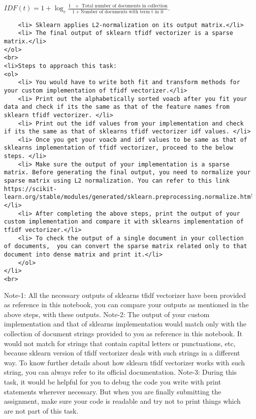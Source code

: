 \documentclass[11pt]{article}
\begin{document}
\(IDF(t) = 1+\log_{e}\frac{1\text{ }+\text{ Total  number of documents in collection}} {1+\text{Number of documents with term t in it}}.\)

\begin{verbatim}
    <li> Sklearn applies L2-normalization on its output matrix.</li>
    <li> The final output of sklearn tfidf vectorizer is a sparse matrix.</li>
</ol>
<br>
<li>Steps to approach this task:
<ol>
    <li> You would have to write both fit and transform methods for your custom implementation of tfidf vectorizer.</li>
    <li> Print out the alphabetically sorted voacb after you fit your data and check if its the same as that of the feature names from sklearn tfidf vectorizer. </li>
    <li> Print out the idf values from your implementation and check if its the same as that of sklearns tfidf vectorizer idf values. </li>
    <li> Once you get your voacb and idf values to be same as that of sklearns implementation of tfidf vectorizer, proceed to the below steps. </li>
    <li> Make sure the output of your implementation is a sparse matrix. Before generating the final output, you need to normalize your sparse matrix using L2 normalization. You can refer to this link https://scikit-learn.org/stable/modules/generated/sklearn.preprocessing.normalize.html </li>
    <li> After completing the above steps, print the output of your custom implementation and compare it with sklearns implementation of tfidf vectorizer.</li>
    <li> To check the output of a single document in your collection of documents,  you can convert the sparse matrix related only to that document into dense matrix and print it.</li>
    </ol>
</li>
<br>
\end{verbatim}

Note-1: All the necessary outputs of sklearns tfidf vectorizer have been
provided as reference in this notebook, you can compare your outputs as
mentioned in the above steps, with these outputs. Note-2: The output of
your custom implementation and that of sklearns implementation would
match only with the collection of document strings provided to you as
reference in this notebook. It would not match for strings that contain
capital letters or punctuations, etc, because sklearn version of tfidf
vectorizer deals with such strings in a different way. To know further
details about how sklearn tfidf vectorizer works with such string, you
can always refer to its official documentation. Note-3: During this
task, it would be helpful for you to debug the code you write with print
statements wherever necessary. But when you are finally submitting the
assignment, make sure your code is readable and try not to print things
which are not part of this task.
\end{document}
